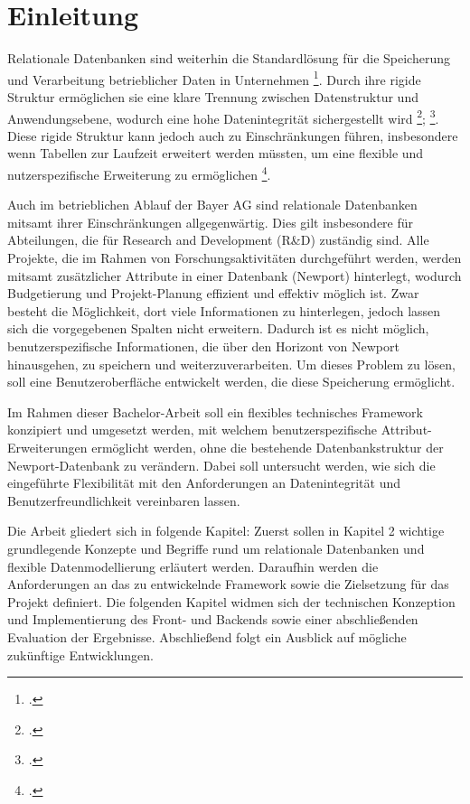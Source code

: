 \section{Einleitung}
Relationale Datenbanken sind weiterhin die Standardlösung für die Speicherung und Verarbeitung betrieblicher Daten in Unternehmen \footcite{Prasad2025}.  
Durch ihre rigide Struktur ermöglichen sie eine klare Trennung zwischen Datenstruktur und Anwendungsebene, wodurch eine hohe Datenintegrität sichergestellt wird \footcite{Codd1970}; \footcite{Date2003}.  
Diese rigide Struktur kann jedoch auch zu Einschränkungen führen, insbesondere wenn Tabellen zur Laufzeit erweitert werden müssten, um eine flexible und nutzerspezifische Erweiterung zu ermöglichen \footcite{Nadkarni2001}.

Auch im betrieblichen Ablauf der Bayer AG sind relationale Datenbanken mitsamt ihrer Einschränkungen allgegenwärtig.  
Dies gilt insbesondere für Abteilungen, die für Research and Development (R\&D) zuständig sind.  
Alle Projekte, die im Rahmen von Forschungsaktivitäten durchgeführt werden, werden mitsamt zusätzlicher Attribute in einer Datenbank (Newport) hinterlegt, wodurch Budgetierung und Projekt-Planung effizient und effektiv möglich ist.  
Zwar besteht die Möglichkeit, dort viele Informationen zu hinterlegen, jedoch lassen sich die vorgegebenen Spalten nicht erweitern.  
Dadurch ist es nicht möglich, benutzerspezifische Informationen, die über den Horizont von Newport hinausgehen, zu speichern und weiterzuverarbeiten.  
Um dieses Problem zu lösen, soll eine Benutzeroberfläche entwickelt werden, die diese Speicherung ermöglicht.

Im Rahmen dieser Bachelor-Arbeit soll ein flexibles technisches Framework konzipiert und umgesetzt werden, mit welchem benutzerspezifische Attribut-Erweiterungen ermöglicht werden, ohne die bestehende Datenbankstruktur der Newport-Datenbank zu verändern.  
Dabei soll untersucht werden, wie sich die eingeführte Flexibilität mit den Anforderungen an Datenintegrität und Benutzerfreundlichkeit vereinbaren lassen.

Die Arbeit gliedert sich in folgende Kapitel:  
Zuerst sollen in Kapitel 2 wichtige grundlegende Konzepte und Begriffe rund um relationale Datenbanken und flexible Datenmodellierung erläutert werden.  
Daraufhin werden die Anforderungen an das zu entwickelnde Framework sowie die Zielsetzung für das Projekt definiert.  
Die folgenden Kapitel widmen sich der technischen Konzeption und Implementierung des Front- und Backends sowie einer abschließenden Evaluation der Ergebnisse.  
Abschließend folgt ein Ausblick auf mögliche zukünftige Entwicklungen.
